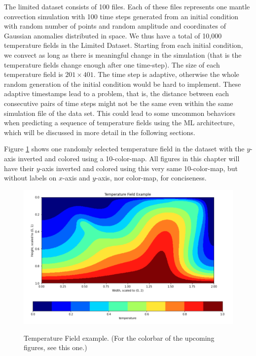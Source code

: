 The limited dataset consists of 100 files.  Each of these files represents one mantle convection simulation with 100 time steps generated from an initial condition with random number of points and random amplitude and coordinates of Gaussian anomalies distributed in space. We thus have a total of 10,000 temperature fields in the Limited Dataset. Starting from each initial condition, we convect as long as there is meaningful change in the simulation (that is the temperature fields change enough after one time-step). The size of each temperature field is $201 \times 401$. The time step is adaptive, otherwise the whole random generation of the initial condition would be hard to implement. These adaptive timestamps lead to a problem, that is, the distance between each consecutive pairs of time steps might not be the same even within the same simulation file of the data set. This could lead to some uncommon behaviors when predicting a sequence of temperature fields using the ML architecture, which will be discussed in more detail in the following sections.

Figure \ref{figure:temperature_field_sample} shows one randomly selected temperature field in the dataset with the $y$-axis inverted and colored using a 10-color-map. All figures in this chapter will have their $y$-axis inverted and colored using this very same 10-color-map, but without labels on $x$-axis and $y$-axis, nor color-map, for conciseness.

\begin{figure}[H]
    \caption{Temperature Field example. (For the colorbar of the upcoming figures, see this one.)}
    \includegraphics[scale=0.6]{figures/mantle_convection_images/temperature_field_example.png}
    \label{figure:temperature_field_sample}
\end{figure}

